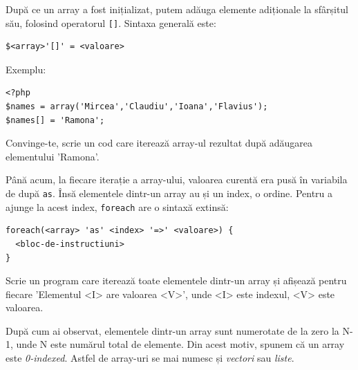 
După ce un array a fost inițializat, putem adăuga elemente adiționale
la sfârșitul său, folosind operatorul \texttt{[]}. Sintaxa generală este:
\begin{verbatim}
$<array>'[]' = <valoare>
\end{verbatim}
Exemplu:
\begin{lstlisting}[label=lst:push_operator,caption={Adăugarea elementelor la sfârșitul unui array}]
<?php
$names = array('Mircea','Claudiu','Ioana','Flavius');
$names[] = 'Ramona';
\end{lstlisting}
Convinge-te, scrie un cod care iterează array-ul rezultat după adăugarea
elementului 'Ramona'.

Până acum, la fiecare iterație a array-ului, valoarea curentă era
pusă în variabila de după \texttt{as}. Însă elementele dintr-un array
au și un index, o ordine. Pentru a ajunge la acest index, \texttt{foreach}
are o sintaxă extinsă:
\begin{verbatim}
foreach(<array> 'as' <index> '=>' <valoare>) {
  <bloc-de-instructiuni>
}
\end{verbatim}

\begin{Exercise}[title={Sintaxa foreach},difficulty=2]
Scrie un program care iterează toate elementele dintr-un array
și afișează pentru fiecare 'Elementul <I> are valoarea <V>', unde <I>
este indexul, <V> este valoarea.

\end{Exercise}

După cum ai observat, elementele dintr-un array sunt numerotate
de la zero la N-1, unde N este numărul total de elemente. Din acest motiv,
spunem că un array este \textsl{0-indexed}. Astfel de array-uri se
mai numesc și \textsl{vectori} sau \textsl{liste}.

